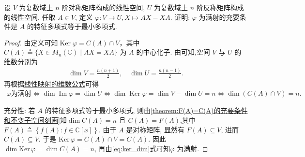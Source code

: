 \documentclass[../../main.tex]{subfiles}%
\begin{document}
\begin{example}
设 \(V\) 为复数域上 \(n\) 阶对称矩阵构成的线性空间, \(U\) 为复数域上 \(n\) 阶反称矩阵构成的线性空间. 任取 \(A \in V\), 定义 \(\varphi: V \to U, X \mapsto AX - XA\). 证明: \(\varphi\) 为满射的充要条件是 \(A\) 的特征多项式等于最小多项式.
\end{example}
\begin{proof}

由定义可知\(\operatorname{Ker} \varphi = C(A) \cap V\)，其中 \(C(A) \triangleq \{X \in M_n(\mathbb{C}) \mid AX = XA\}\) 为 \(A\) 的中心化子.
由可知,空间 \(V\) 与 \(U\) 的维数分别为
\begin{align*}
\dim V = \frac{n(n+1)}{2}, \quad \dim U = \frac{n(n-1)}{2}. 
\end{align*}
再根据\hyperref[theorem:线性映射的维数公式]{线性映射的维数公式}可得
\begin{align}
\varphi\text{为满射}\iff \dim \operatorname{Im} \varphi = \dim U\iff \dim \operatorname{Ker} \varphi = \dim V - \dim U = n\iff \dim(C(A) \cap V) = n. \label{eq:ker_dim}
\end{align}

{\heiti 充分性:} 若 \(A\) 的特征多项式等于最小多项式, 则由\cref{theorem:F(A)=C(A)的充要条件和不变子空间刻画}知\(\dim C(A) = n\) 且 \(C(A) = F(A)\),其中$F\left( A \right) \triangleq \left\{ f\left( A \right) :f\in \mathbb{C} \left[ x \right] \right\}$. 由于 \(A\) 是对称矩阵, 显然有 \(F(A) \subseteq V\), 进而 \(C(A) \subseteq V\).
于是 \(\text{Ker}\, \varphi = C(A) \cap V = C(A)\).
因此 \(\dim \text{Ker}\, \varphi = \dim C(A) = n\), 再由\eqref{eq:ker_dim}式可知\(\varphi\) 为满射.


\end{proof}
\end{document}
